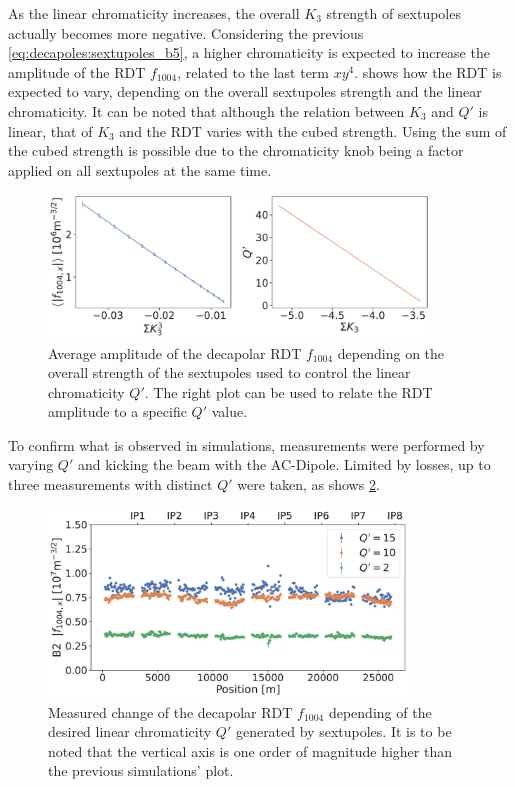 As the linear chromaticity increases, the overall $K_3$ strength of sextupoles actually becomes 
more negative. Considering the previous \cref{eq:decapoles:sextupoles_b5}, a higher chromaticity
is expected to increase the amplitude of the RDT $f_{1004}$, related to the last term $xy^4$.
 shows how the RDT is expected to vary, depending on the
overall sextupoles strength and the linear chromaticity. It can be noted that although the relation
between $K_3$ and $Q'$ is linear, that of $K_3$ and the RDT varies with the cubed strength. Using 
the sum of the cubed strength is possible due to the chromaticity knob being a factor applied on all
sextupoles at the same time.

\begin{figure}[!htb]
    \centering
    \includegraphics[width=0.9\textwidth]{./images/f1004/avg_f1004_k3.pdf}
    \caption{Average amplitude of the decapolar RDT $f_{1004}$ depending on the overall strength
    of the sextupoles used to control the linear chromaticity $Q'$. The right plot can be used
    to relate the RDT amplitude to a specific $Q'$ value.}
    \label{fig:decapoles:sextupoles_k3_f1004}
\end{figure}


To confirm what is observed in simulations, measurements were performed by varying $Q'$ and kicking
the beam with the AC-Dipole. Limited by losses, up to three measurements with distinct $Q'$ were
taken, as shows \cref{fig:decapoles:rdts:measured_f1004_from_sextupoles}.

\begin{figure}[!htb]
    \centering
    \includegraphics[width=0.85\textwidth]{./images/f1004/f1004x_q2_q10_q15.pdf}
    \caption{Measured change of the decapolar RDT $f_{1004}$ depending of the desired linear
    chromaticity $Q'$ generated by sextupoles. It is to be noted that the vertical axis is one
    order of magnitude higher than the previous simulations' plot.
    }
    \label{fig:decapoles:rdts:measured_f1004_from_sextupoles}
\end{figure}

